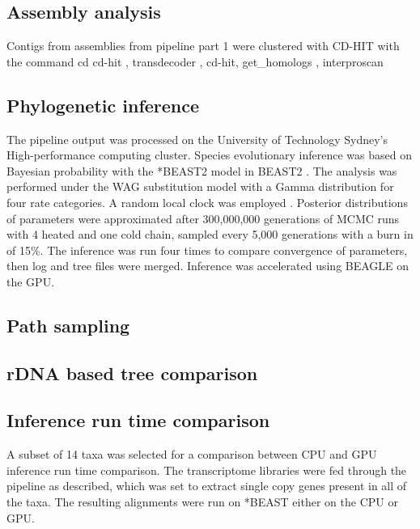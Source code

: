 \documentclass[12pt]{article}
\begin{document}
\subsection*{Assembly analysis}
Contigs from assemblies from pipeline part 1 were clustered with CD-HIT with the command cd 
cd-hit \cite{fu2012cd}, transdecoder \cite{haas2016transdecoder}, cd-hit, get\_homologs \cite{contreras2013gethom}, interproscan \cite{quevillon2005interproscan}

\subsection*{Phylogenetic inference}
The pipeline output was processed on the University of Technology Sydney's High-performance computing cluster.
Species evolutionary inference was based on Bayesian probability with the *BEAST2 model in BEAST2 \cite{bouckaert2014beast}. 
The analysis was performed under the WAG substitution model \cite{whelan2001general} with a Gamma distribution for four rate categories. 
A random local clock was employed \cite{drummond2010bayesian}. 
Posterior distributions of parameters were approximated after 300,000,000 generations of MCMC runs with 4 heated and one cold chain, sampled every 5,000 generations  with a burn in of 15\%. 
The inference was run four times to compare convergence of parameters, then log and tree files were merged. 
Inference was accelerated using BEAGLE \cite{ayres2011beagle} on the GPU.

\subsection{Path sampling}


\subsection*{rDNA based tree comparison}
\subsection*{Inference run time comparison}
A subset of 14 taxa was selected for a comparison between CPU and GPU inference run time comparison. 
The transcriptome libraries were fed through the pipeline as described, which was set to extract single copy genes present in all of the taxa. 
The resulting alignments were run on *BEAST either on the CPU or GPU.
\end{document}
